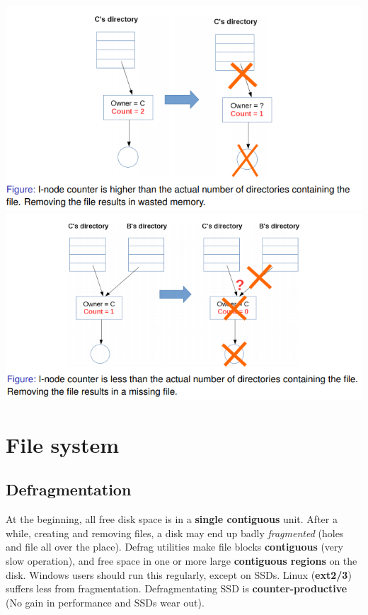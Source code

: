 \documentclass{article}
\begin{document}
\begin{center}
	\includegraphics[scale=0.3]{i_node_constency_higher.png}
	\includegraphics[scale=0.3]{i_node_consistency_lower.png}
\end{center}

\section{File system}
\subsection{Defragmentation}
\begin{flushleft}
At the beginning, all free disk space is in a \textbf{single contiguous} unit. After a while, creating and removing files, a disk may end up badly \textit{fragmented} (holes and file all over the place). Defrag utilities make file blocks \textbf{contiguous} (very slow operation), and free space in one or more large \textbf{contiguous regions} on the disk. Windows users should run this regularly, except on SSDs. Linux (\textbf{ext2/3}) suffers less from fragmentation. Defragmentating SSD is \textbf{counter-productive} (No gain in performance and SSDs wear out).
\end{flushleft}
\end{document}
